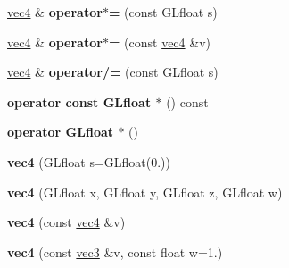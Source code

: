\begin{DoxyCompactItemize}
\item 
\hypertarget{struct_angel_1_1vec4_a4be39a53eb58b9f5c0e980fdb7de0577}{\hyperlink{struct_angel_1_1vec4}{vec4} \& {\bfseries operator$\ast$=} (const \-G\-Lfloat s)}\label{struct_angel_1_1vec4_a4be39a53eb58b9f5c0e980fdb7de0577}

\item 
\hypertarget{struct_angel_1_1vec4_afd839b5ec7d024f060c19260e53f50c7}{\hyperlink{struct_angel_1_1vec4}{vec4} \& {\bfseries operator$\ast$=} (const \hyperlink{struct_angel_1_1vec4}{vec4} \&v)}\label{struct_angel_1_1vec4_afd839b5ec7d024f060c19260e53f50c7}

\item 
\hypertarget{struct_angel_1_1vec4_a11ef303f086d8364d26150d6bd5592fe}{\hyperlink{struct_angel_1_1vec4}{vec4} \& {\bfseries operator/=} (const \-G\-Lfloat s)}\label{struct_angel_1_1vec4_a11ef303f086d8364d26150d6bd5592fe}

\item 
\hypertarget{struct_angel_1_1vec4_a71c7509461ea7152c6785bfbc811ab64}{{\bfseries operator const G\-Lfloat $\ast$} () const }\label{struct_angel_1_1vec4_a71c7509461ea7152c6785bfbc811ab64}

\item 
\hypertarget{struct_angel_1_1vec4_abe6702f74ba431df65da55aa0df6de16}{{\bfseries operator G\-Lfloat $\ast$} ()}\label{struct_angel_1_1vec4_abe6702f74ba431df65da55aa0df6de16}

\item 
\hypertarget{struct_angel_1_1vec4_afa13c9f342969e0ee740abbe3b7b8b4c}{{\bfseries vec4} (\-G\-Lfloat s=\-G\-Lfloat(0.))}\label{struct_angel_1_1vec4_afa13c9f342969e0ee740abbe3b7b8b4c}

\item 
\hypertarget{struct_angel_1_1vec4_add0c2aa60bd9a4930c016fe08ffced70}{{\bfseries vec4} (\-G\-Lfloat x, \-G\-Lfloat y, \-G\-Lfloat z, \-G\-Lfloat w)}\label{struct_angel_1_1vec4_add0c2aa60bd9a4930c016fe08ffced70}

\item 
\hypertarget{struct_angel_1_1vec4_a72b386b6ebca67a90f47c12407e064f7}{{\bfseries vec4} (const \hyperlink{struct_angel_1_1vec4}{vec4} \&v)}\label{struct_angel_1_1vec4_a72b386b6ebca67a90f47c12407e064f7}

\item 
\hypertarget{struct_angel_1_1vec4_a48f563362bfe698603c365cc400bd99a}{{\bfseries vec4} (const \hyperlink{struct_angel_1_1vec3}{vec3} \&v, const float w=1.)}\label{struct_angel_1_1vec4_a48f563362bfe698603c365cc400bd99a}


\end{DoxyCompactItemize}
